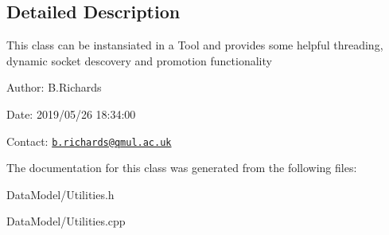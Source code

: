 \subsection{Detailed Description}
This class can be instansiated in a Tool and provides some helpful threading, dynamic socket descovery and promotion functionality

\begin{DoxyParagraph}{Author\-:}
B.\-Richards 
\end{DoxyParagraph}
\begin{DoxyParagraph}{Date\-:}
2019/05/26 18\-:34\-:00 
\end{DoxyParagraph}
Contact\-: \href{mailto:b.richards@qmul.ac.uk}{\tt b.\-richards@qmul.\-ac.\-uk} 

The documentation for this class was generated from the following files\-:\begin{DoxyCompactItemize}
\item 
Data\-Model/Utilities.\-h\item 
Data\-Model/Utilities.\-cpp\end{DoxyCompactItemize}
